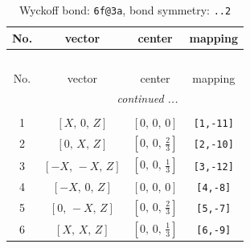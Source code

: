 \documentclass[fleqn,8pt]{jsarticle}
\begin{document}
\begin{longtable}{cccc}
\caption{Wyckoff bond: {\tt 6f@3a}, bond symmetry: {\tt ..2}}
 \\
 \hline \hline
No. & vector & center & mapping \\ \hline \endfirsthead

\multicolumn{3}{l}{\tablename\ \thetable{}} \\
 \hline \hline
No. & vector & center & mapping \\ \hline \endhead

 \hline \hline
\multicolumn{3}{r}{\footnotesize\it continued ...} \\ \endfoot

 \hline \hline
\multicolumn{3}{r}{} \\ \endlastfoot

1 & $\left[ X,\, 0,\, Z \right]$ & $\left[ 0,\, 0,\, 0 \right]$ & {\tt [1,-11]} \\ \hline
2 & $\left[ 0,\, X,\, Z \right]$ & $\left[ 0,\, 0,\, \frac{2}{3} \right]$ & {\tt [2,-10]} \\ \hline
3 & $\left[ - X,\, - X,\, Z \right]$ & $\left[ 0,\, 0,\, \frac{1}{3} \right]$ & {\tt [3,-12]} \\ \hline
4 & $\left[ - X,\, 0,\, Z \right]$ & $\left[ 0,\, 0,\, 0 \right]$ & {\tt [4,-8]} \\ \hline
5 & $\left[ 0,\, - X,\, Z \right]$ & $\left[ 0,\, 0,\, \frac{2}{3} \right]$ & {\tt [5,-7]} \\ \hline
6 & $\left[ X,\, X,\, Z \right]$ & $\left[ 0,\, 0,\, \frac{1}{3} \right]$ & {\tt [6,-9]} \\
\end{longtable}
\renewcommand{\arraystretch}{1.2}
\end{document}

